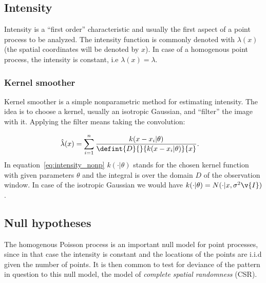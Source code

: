 \documentclass[12pt,a4paper,oneside,article]{memoir}
\begin{document}
\subsection{Intensity}
Intensity is a ``first order'' characteristic and usually the first aspect
of a point process to be analyzed. The intensity function is commonly denoted with $\lambda(x)$ (the spatial
coordinates will be denoted by $x$).
In case of a homogenous point process, the intensity is constant, i.e $\lambda(x)=\lambda$.

\subsubsection{Kernel smoother}

Kernel smoother is a simple nonparametric method for estimating intensity. The idea is
to choose a kernel, usually an isotropic Gaussian, and ``filter'' the image with it. 
Applying the filter means taking the convolution:

\begin{align}
	\hat{\lambda}(x)&=\sum_{i=1}^n\frac{k(x-x_i|\theta)}{\defint{D}{}{k(x-x_i|\theta)}{x}}.
	\label{eq:intensity_nonp}
\end{align}
In equation~\eqref{eq:intensity_nonp} $k(\cdot|\theta)$ stands for the chosen kernel function with
given parameters $\theta$ and the integral is over the domain $D$ of the observation window. 
In case of the isotropic Gaussian we would have $k(\cdot|\theta)=N(\cdot|x,\sigma^2\v{I})$.


\subsection{Null hypotheses}

The homogenous Poisson process is an important null model for point processes, since
in that case the intensity is constant and the locations of the points are i.i.d given
the number of points. It is then common to test for deviance of the pattern in question
to this null model, the model of \emph{complete spatial randomness} (CSR).
\end{document}
